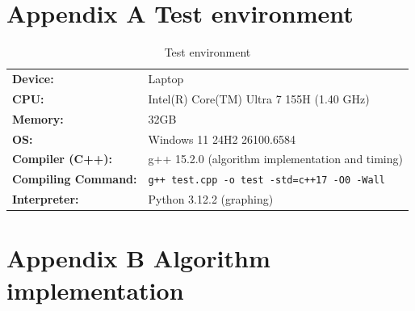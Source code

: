 \documentclass[12pt]{article}
\begin{document}



\section*{Appendix A Test environment}

\begin{longtable}{@{}ll@{}}
\caption{Test environment} \label{tab.env} \\
\textbf{Device:} & Laptop \\
\textbf{CPU:} & Intel(R) Core(TM) Ultra 7 155H (1.40 GHz) \\
\textbf{Memory:} & 32GB \\
\textbf{OS:} & Windows 11 24H2 26100.6584 \\
\textbf{Compiler (C++):} & g++ 15.2.0 (algorithm implementation and timing) \\
\textbf{Compiling Command:} & \texttt{g++ test.cpp -o test -std=c++17 -O0 -Wall} \\
\textbf{Interpreter:} & Python 3.12.2 (graphing) \\
\end{longtable}

\section*{Appendix B Algorithm implementation}

%





\end{document}
